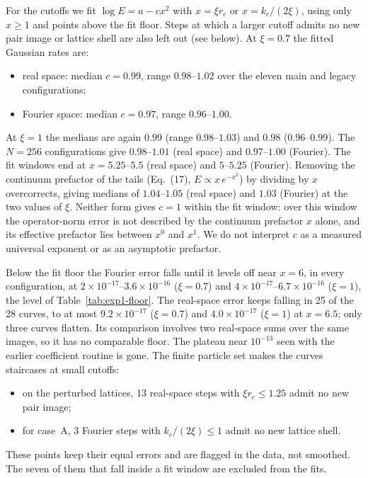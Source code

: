 For the cutoffs we fit $\log E=a-cx^2$ with $x=\xi r_c$ or $x=k_c/(2\xi)$, using only $x\ge1$ and points above the fit
floor. Steps at which a larger cutoff admits no new pair image or lattice shell are also left out (see below).
At $\xi=0.7$ the fitted Gaussian rates are:
\begin{itemize}
\item real space: median $c=0.99$, range $0.98$--$1.02$ over the eleven main and legacy configurations;
\item Fourier space: median $c=0.97$, range $0.96$--$1.00$.
\end{itemize}
At $\xi=1$ the medians are again $0.99$ (range $0.98$--$1.03$) and $0.98$ ($0.96$--$0.99$). The $N=256$ configurations
give $0.98$--$1.01$ (real space) and $0.97$--$1.00$ (Fourier). The fit windows end at $x=5.25$--$5.5$ (real space) and $5$--$5.25$ (Fourier). Removing the
continuum prefactor of the tails (Eq.~(17), $E\propto x\,e^{-x^2}$) by dividing by $x$ overcorrects, giving medians
of $1.04$--$1.05$ (real space) and $1.03$ (Fourier) at the two values of $\xi$. Neither form gives $c=1$ within the fit window: over this window the
operator-norm error is not described by the continuum prefactor $x$ alone, and its effective prefactor lies between
$x^0$ and $x^1$. We do not interpret $c$ as a measured universal exponent or as an asymptotic prefactor.

Below the fit floor the Fourier error falls until it levels off near $x=6$, in every configuration, at
$2\times10^{-17}$--$3.6\times10^{-16}$ ($\xi=0.7$) and $4\times10^{-17}$--$6.7\times10^{-16}$ ($\xi=1$), the level of
Table~\ref{tab:exp1-floor}. The real-space error keeps falling in 25 of the 28 curves, to at most $9.2\times10^{-17}$
($\xi=0.7$) and $4.0\times10^{-17}$ ($\xi=1$) at $x=6.5$; only three curves flatten. Its comparison involves two
real-space sums over the same images, so it has no comparable floor. The plateau near $10^{-13}$ seen with the earlier
coefficient routine is gone.
The finite particle set makes the curves staircases at small cutoffs:
\begin{itemize}
\item on the perturbed lattices, 13 real-space steps with $\xi r_c\le1.25$ admit no new pair image;
\item for case~A, 3 Fourier steps with $k_c/(2\xi)\le1$ admit no new lattice shell.
\end{itemize}
These points keep their equal errors and are flagged in the data, not smoothed. The seven of them that fall
inside a fit window are excluded from the fits.

